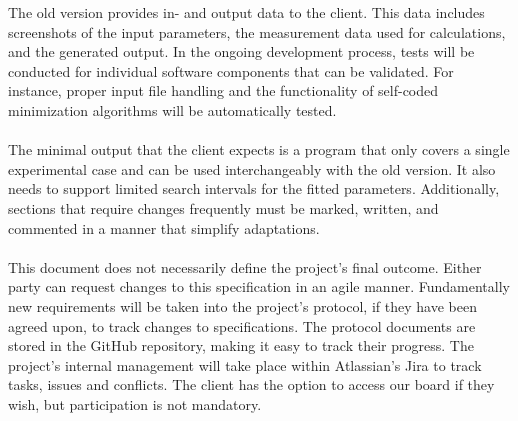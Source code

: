 \documentclass[
	points=true,
 	nenglish,
	colorbacktitle,
	identbarcolor=2b,
	accentcolor=2b
	]{tudaexercise}
\begin{document}
The old version provides in- and output data to the client. This data includes screenshots of the input parameters, the measurement data used for calculations, and the generated output.
In the ongoing development process, tests will be conducted for individual software components that can be validated. For instance, proper input file handling and the functionality of self-coded minimization algorithms will be automatically tested. \\ \\

The minimal output that the client expects is a program that only covers a single experimental case and can be used interchangeably with the old version. It also needs to support limited search intervals for the fitted parameters. Additionally, sections that require changes frequently must be marked, written, and commented in a manner that simplify adaptations. \\ \\

This document does not necessarily define the project's final outcome. Either party can request changes to this specification in an agile manner. Fundamentally new requirements will be taken into the project's protocol, if they have been agreed upon, to track changes to specifications. The protocol documents are stored in the GitHub repository, making it easy to track their progress.
The project's internal management will take place within Atlassian's Jira to track tasks, issues and conflicts. The client has the option to access our board if they wish, but participation is not mandatory.\\ \\
\end{document}
